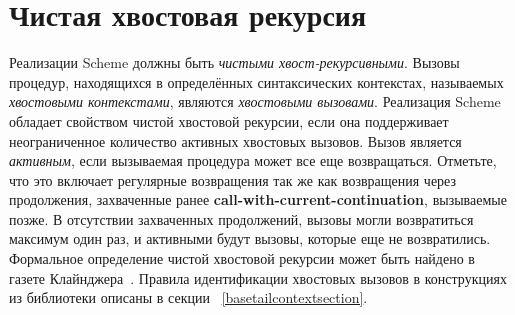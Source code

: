 \section{Чистая хвостовая рекурсия}\vspace{-1mm}
\label{proper tail recursion}

Реализации Scheme должны быть {\em чистыми хвост-рекурсивными}. Вызовы процедур, находящихся в определённых синтаксических контекстах, называемых
\textit{хвостовыми контекстами}, являются \textit{хвостовыми
  вызовами}. Реализация Scheme обладает свойством чистой хвостовой
рекурсии, если она поддерживает неограниченное количество активных хвостовых вызовов. Вызов
является {\em активным}, если вызываемая процедура может все еще возвращаться. Отметьте, что это
включает регулярные возвращения так же как возвращения через продолжения, захваченные ранее
{\bfseries\cf call-with-current-continuation}, вызываемые позже. В отсутствии захваченных
продолжений, вызовы могли возвратиться максимум один раз, и активными будут вызовы, которые еще
не возвратились. Формальное определение чистой хвостовой рекурсии может быть найдено в газете
Клайнджера~\cite{propertailrecursion}. Правила идентификации хвостовых вызовов в конструкциях из
библиотеки \textbf{} описаны в секции ~\ref{basetailcontextsection}.\vspace{-2mm}

